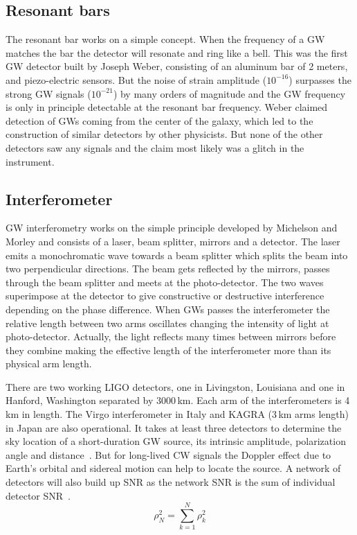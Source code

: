 \documentclass{ttuthes2007}
\begin{document}
\subsection{Resonant bars}
The resonant bar works on a simple concept. When the frequency of a
\ac{GW} matches the bar the detector will resonate and ring like a bell. This
was the first \ac{GW} detector built by Joseph Weber, consisting of an
aluminum bar of 2 meters, and piezo-electric sensors. But the
noise of strain amplitude ($10^{-16}$) surpasses the strong \ac{GW}
signals ($10^{-21}$) by many orders of
magnitude and the GW frequency is only in principle detectable at the resonant
bar frequency. Weber claimed detection of \acp{GW} coming from the center of
 the galaxy, which led to the construction of similar detectors by other
physicists. But none of the
other detectors saw any signals and the claim most likely was a glitch in the
instrument.
\subsection{Interferometer}
\ac{GW} interferometry works on the simple principle
developed by Michelson and Morley and consists of a laser, beam splitter,
mirrors and a detector. The laser emits a monochromatic wave towards a beam
splitter which splits the beam into two perpendicular directions. The beam gets
reflected by the mirrors, passes through the beam splitter and meets at the
photo-detector. The two waves superimpose at the detector to give constructive or
destructive interference depending on the phase difference. When \acp{GW} passes
the interferometer the relative length between two arms oscillates changing the
intensity of light at photo-detector. Actually, the light reflects many times
between mirrors before they combine making the effective length of the
interferometer more than its physical arm length.

There are two working \ac{LIGO} detectors, one in Livingston, Louisiana and one
in Hanford, Washington 
separated by 3000\,km. Each arm of the interferometers is 4\,km in length. The
Virgo interferometer in Italy and KAGRA (3\,km arms length) in Japan are also
operational. It takes at least three detectors to determine the sky location of 
a short-duration \ac{GW} source, its intrinsic amplitude, polarization angle and 
distance~\cite{Schutz_2011}. But for long-lived \ac{CW} signals the Doppler effect
due to Earth's orbital and sidereal motion can help to locate the source. A
network of detectors will also build up \ac{SNR} as the
network SNR is the sum of individual detector SNR~\cite{Schutz_2011}.
\begin{equation}
\rho_N^2=\sum_{k=1}^N \rho_k^2 
\end{equation}
\end{document}
